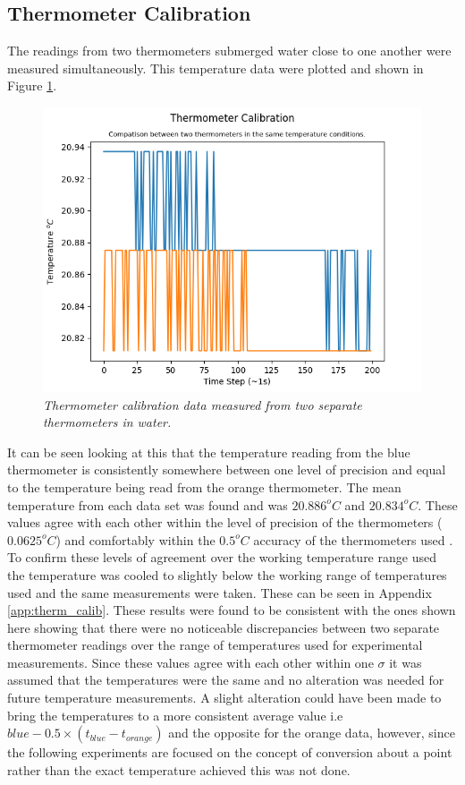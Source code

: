 \documentclass[10pt]{article}
\begin{document}
\subsection*{Thermometer Calibration}
The readings from two thermometers submerged water close to one another were measured simultaneously. This temperature data were plotted and shown in Figure \ref{fig:therm_calib}.
\begin{figure}[h!]
    \centering
    \includegraphics[scale=0.75]{therm_calib.png}
    \caption{\it{Thermometer calibration data measured from two separate thermometers in water.}}
    \label{fig:therm_calib}
\end{figure}

It can be seen looking at this that the temperature reading from the blue thermometer is consistently somewhere between one level of precision and equal to the temperature being read from the orange thermometer. The mean temperature from each data set was found and was $20.886^oC$ and $20.834^oC$. These values agree with each other within the level of precision of the thermometers ($0.0625^oC$) and comfortably within the $0.5^oC$ accuracy of the thermometers used \cite{thermometer}. To confirm these levels of agreement over the working temperature range used the temperature was cooled to slightly below the working range of temperatures used and the same measurements were taken. These can be seen in Appendix \ref{app:therm_calib}. These results were found to be consistent with the ones shown here showing that there were no noticeable discrepancies between two separate thermometer readings over the range of temperatures used for experimental measurements.
Since these values agree with each other within one $\sigma$ it was assumed that the temperatures were the same and no alteration was needed for future temperature measurements. A slight alteration could have been made to bring the temperatures to a more consistent average value i.e $blue - 0.5\times(t_{blue}-t_{orange})$ and the opposite for the orange data, however, since the following experiments are focused on the concept of conversion about a point rather than the exact temperature achieved this was not done.
\end{document}
